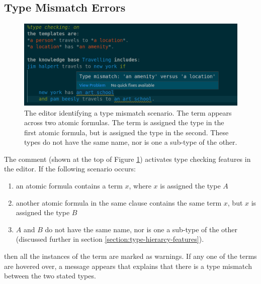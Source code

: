 \documentclass[../main.tex]{subfiles}
\begin{document}
\subsection{Type Mismatch Errors}
\begin{figure}[h!]
\centering
\includegraphics[width = \linewidth]{./figures/type-error.png}
\caption{The editor identifying a type mismatch scenario. The term  appears across two atomic formulas. The term is assigned the type  in the first atomic formula, but is assigned the type  in the second. These types do not have the same name, nor is one a sub-type of the other.}
\label{fig:type-mismatch}
\end{figure}
The comment %
(shown at the top of Figure \ref{fig:type-mismatch}) activates type checking features in the editor. If the following scenario occurs:
\begin{enumerate}
    \item an atomic formula contains a term $x$, where $x$ is assigned the type $A$
    \item another atomic formula in the same clause contains the same term $x$, but $x$ is assigned the type $B$
    \item $A$ and $B$ do not have the same name, nor is one a sub-type of the other (discussed further in section \ref{section:type-hierarcy-features}).
\end{enumerate}
then all the instances of the term are marked as warnings. If any one of the terms are hovered over, a message appears that explains that there is a type mismatch between the two stated types.
\end{document}
